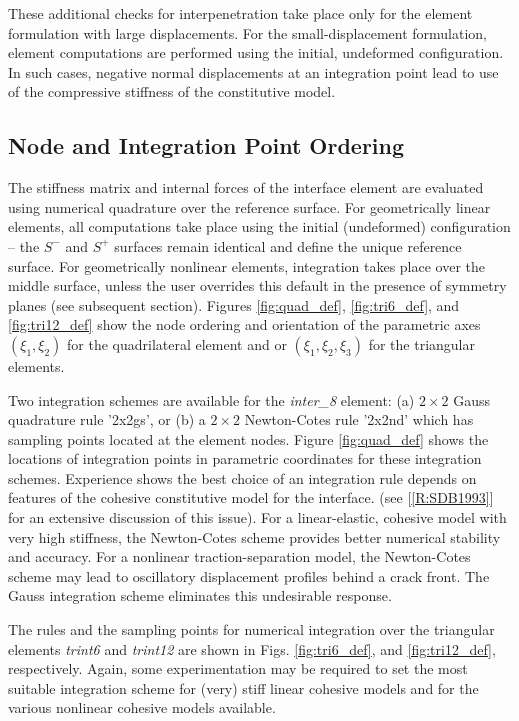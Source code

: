 \documentclass[11pt]{report}
\numberwithin{equation}{section}
\newcommand{\ti}{\emph}
\begin{document}
These additional checks for interpenetration take place only for 
the element formulation with large displacements. 
For the small-displacement formulation, 
element computations are performed using the 
initial, undeformed configuration. In such cases, 
negative normal displacements at an integration 
point lead to use of the compressive stiffness of the constitutive model.

\subsection{Node and Integration Point Ordering}
The stiffness matrix and internal forces of the interface element 
are evaluated using numerical quadrature over the reference surface.  For geometrically
linear elements, all computations take place using the
initial (undeformed) configuration -- the  $S^-$ and $S^+$ surfaces  
remain identical  and define the unique reference surface. For geometrically nonlinear
elements, integration takes place over the middle surface, unless
the user overrides this default in the presence of symmetry planes (see subsequent
section). Figures  \ref{fig:quad_def},  
\ref{fig:tri6_def}, and  \ref{fig:tri12_def} 
show the node ordering and orientation of the parametric axes $(\xi_1,\xi_2)$ 
for the quadrilateral element and 
or $(\xi_1,\xi_2, \xi_3)$ for the triangular elements.  

 Two integration schemes are available for the 
 \ti{inter\_8} element: (a) $2 \times 2$ Gauss 
 quadrature rule '2x2gs', or (b)
 a $2 \times 2$ Newton-Cotes rule '2x2nd' 
 which has sampling points located at 
 the element nodes. Figure \ref{fig:quad_def} shows the locations of integration points 
 in parametric coordinates for these integration schemes. Experience shows the best choice of 
 an integration rule depends on features of the cohesive constitutive model for the 
 interface. (see [\ref{R:SDB1993}] for an extensive
 discussion of this issue).
 For a linear-elastic, cohesive model with very high stiffness, the 
 Newton-Cotes scheme provides better numerical stability and accuracy. 
 For a nonlinear traction-separation model, the Newton-Cotes scheme 
 may lead to oscillatory displacement profiles behind a crack front. The 
 Gauss integration scheme eliminates this undesirable response. 
 
The  rules and the sampling points for numerical integration 
over the triangular elements \ti{trint6} and \ti{trint12} are shown 
in Figs. \ref{fig:tri6_def}, and  \ref{fig:tri12_def}, respectively. Again, some
experimentation may be required to set the most suitable integration scheme
for (very) stiff linear cohesive models and for the various nonlinear
cohesive models available.
 
\end{document}
